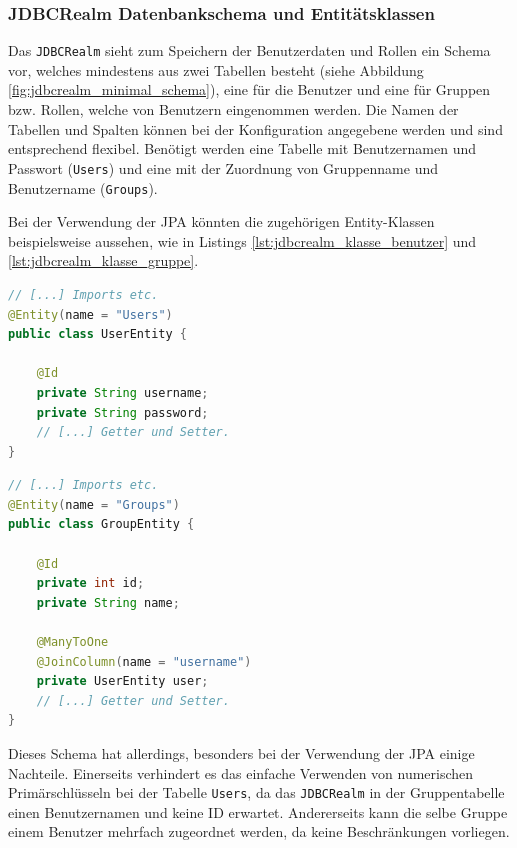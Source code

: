 \subsubsection{JDBCRealm Datenbankschema und Entitätsklassen}
Das \texttt{JDBCRealm} sieht zum Speichern der Benutzerdaten und Rollen ein Schema vor, welches mindestens aus zwei Tabellen besteht (siehe Abbildung \ref{fig:jdbcrealm_minimal_schema}), eine für die Benutzer und eine für Gruppen bzw. Rollen, welche von Benutzern eingenommen werden.
Die Namen der Tabellen und Spalten können bei der Konfiguration angegebene werden und sind entsprechend flexibel.
Benötigt werden eine Tabelle mit Benutzernamen und Passwort (\texttt{Users}) und eine mit der Zuordnung von Gruppenname und Benutzername (\texttt{Groups}).

Bei der Verwendung der \ac{JPA} könnten die zugehörigen Entity-Klassen beispielsweise aussehen, wie in Listings \ref{lst:jdbcrealm_klasse_benutzer} und \ref{lst:jdbcrealm_klasse_gruppe}.

\begin{minipage}[t]{0.45\textwidth}
\begin{lstlisting}[language=Java,caption={Beispiel für eine UserEntity Klasse.}, label=lst:jdbcrealm_klasse_benutzer]
// [...] Imports etc.
@Entity(name = "Users")
public class UserEntity {

    @Id
    private String username;
    private String password;
    // [...] Getter und Setter.
}
\end{lstlisting}
\end{minipage}
\hfill
\begin{minipage}[t]{0.45\textwidth}
\begin{lstlisting}[language=Java,caption={Beispiel für eine GroupEntity Klasse.}, label=lst:jdbcrealm_klasse_gruppe]
// [...] Imports etc.
@Entity(name = "Groups")
public class GroupEntity {

    @Id
    private int id;
    private String name;

    @ManyToOne
    @JoinColumn(name = "username")
    private UserEntity user;
    // [...] Getter und Setter.
}
\end{lstlisting}
\end{minipage}

Dieses Schema hat allerdings, besonders bei der Verwendung der \ac{JPA} einige Nachteile.
Einerseits verhindert es das einfache Verwenden von numerischen Primärschlüsseln bei der Tabelle \texttt{Users}, da das \texttt{JDBCRealm} in der Gruppentabelle einen Benutzernamen und keine ID erwartet. 
Andererseits kann die selbe Gruppe einem Benutzer mehrfach zugeordnet werden, da keine Beschränkungen vorliegen.

